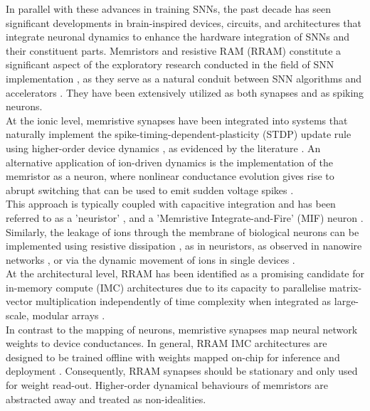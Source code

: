 \noindent In parallel with these advances in training SNNs, the past decade has seen significant developments in brain-inspired devices, circuits, and architectures that integrate neuronal dynamics to enhance the hardware integration of SNNs and their constituent parts. Memristors and resistive RAM (RRAM) constitute a significant aspect of the exploratory research conducted in the field of SNN implementation \cite{chua1971memristor}, as they serve as a natural conduit between SNN algorithms and accelerators \cite{chua1976memristive}. They have been extensively utilized as both synapses and as spiking neurons. \\

\noindent At the ionic level, memristive synapses have been integrated into systems that naturally implement the spike-timing-dependent-plasticity (STDP) update rule using higher-order device dynamics \cite{serrano2013stdp}, as evidenced by the literature \cite{lin2020adaptive}. An alternative application of ion-driven dynamics is the implementation of the memristor as a neuron, where nonlinear conductance evolution gives rise to abrupt switching that can be used to emit sudden voltage spikes \cite{lim2015reliability}.\\

\noindent This approach \cite{bao2019dual} is typically coupled with capacitive integration and has been referred to as a 'neuristor' \cite{del2020caloritronics}, and a 'Memristive Integrate-and-Fire' (MIF) neuron \cite{hao2020monolayer,kang2021build,zhou2022fully}. Similarly, the leakage of ions through the membrane of biological neurons can be implemented using resistive dissipation \cite{loeffler2021modularity}, as in neuristors, as observed in nanowire networks \cite{hochstetter2021avalanches,zhu2021mnist}, or via the dynamic movement of ions in single devices \cite{zhu2020memristor}. \\

\noindent At the architectural level, RRAM has been identified as a promising candidate for in-memory compute (IMC) architectures \cite{li2018analog} due to its capacity to parallelise matrix-vector multiplication independently of time complexity when integrated as large-scale, modular arrays \cite{eshraghian20213}. \\

\noindent In contrast to the mapping of neurons, memristive synapses map neural network weights to device conductances. In general, RRAM IMC architectures are designed to be trained offline with weights mapped on-chip for inference and deployment \cite{zhang2020brain}. Consequently, RRAM synapses should be stationary and only used for weight read-out. Higher-order dynamical behaviours of memristors are abstracted away and treated as non-idealities.\\

